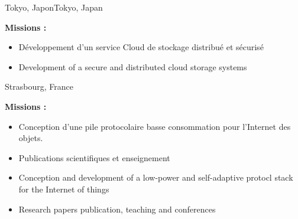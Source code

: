 \vspace{\ItemsSpacing}

{}{}{\ifnativelang Tokyo, Japon\else Tokyo, Japan\fi}{
\textcolor{color1}{\textbf{Missions :}}
\begin{itemize}
\ifnativelang
\item D\'eveloppement d'un service Cloud de stockage distribu\'e et s\'ecuris\'e
\else
\item Development of a secure and distributed cloud storage systems
\fi
\end{itemize}
}

\vspace{\ItemsSpacing}

{}{}{Strasbourg, France}{
\textcolor{color1}{\textbf{Missions :}}
\begin{itemize}
\ifnativelang
\item Conception d'une pile protocolaire basse consommation pour l'Internet des objets.
\item Publications scientifiques et enseignement
\else
\item Conception and development of a low-power and self-adaptive protocl stack for the Internet of things
\item Research papers publication, teaching and conferences
\fi
\end{itemize}
}


